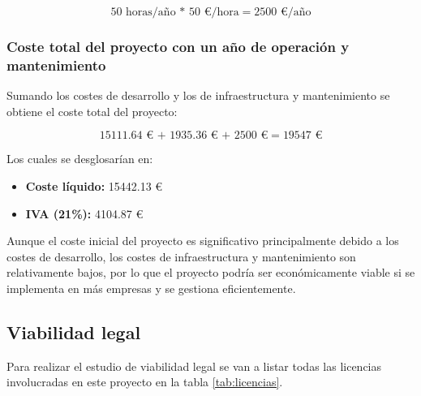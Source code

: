 \[50 \text{ horas/año * } 50 \text{ €/hora} = \num{2500} \text{ €/año}\]

\subsubsection{Coste total del proyecto con un año de operación y mantenimiento}

Sumando los costes de desarrollo y los de infraestructura y mantenimiento se obtiene el coste total del proyecto:

\[\num{15111,64} \text{ € + } \num{1935,36} \text{ € + } \num{2500} \text{ €} = \num{19547} \text{ €}\]

Los cuales se desglosarían en:

\begin{itemize}
	\item \textbf{Coste líquido:} \num{15442,13} €
	\item \textbf{IVA (21\%):} \num{4104,87} €
\end{itemize}

Aunque el coste inicial del proyecto es significativo principalmente debido a los costes de desarrollo, los costes de infraestructura y mantenimiento son relativamente bajos, por lo que el proyecto podría ser económicamente viable si se implementa en más empresas y se gestiona eficientemente.

\subsection{Viabilidad legal}

Para realizar el estudio de viabilidad legal se van a listar todas las licencias involucradas en este proyecto en la tabla \ref{tab:licencias}.

